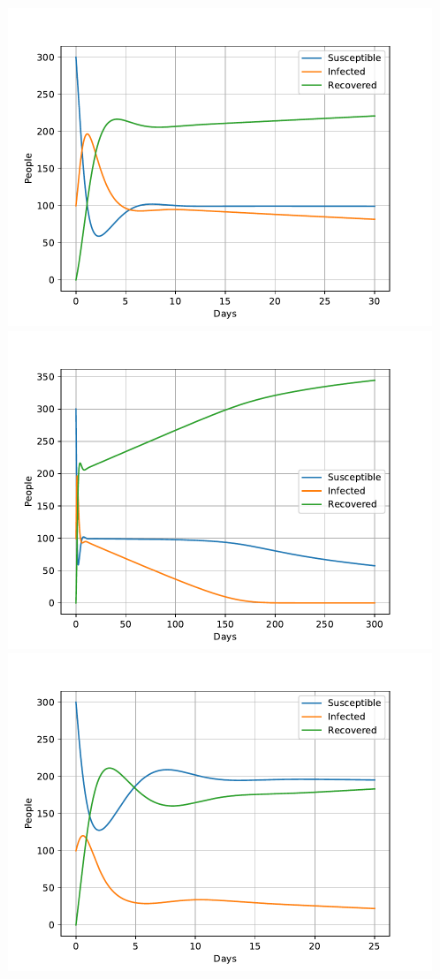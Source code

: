 \documentclass[a4paper]{article}
\begin{document}
\begin{figure}[!htb]
	\centering 
	\includegraphics[scale=0.56]{../plots/opp_e_A1.pdf}
	\includegraphics[scale=0.56]{../plots/opp_e_A2.pdf}
	\includegraphics[scale=0.56]{../plots/opp_e_B1.pdf}	

\end{figure}
\end{document}
